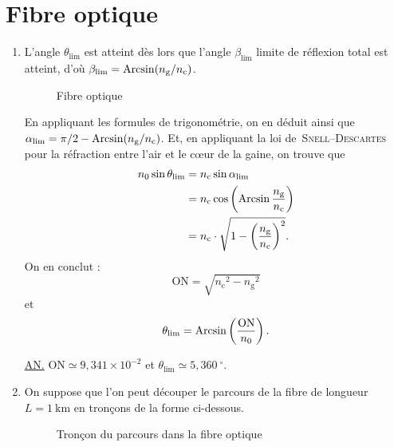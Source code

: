 \section{Fibre optique}

\begin{enumerate}
	\item L'angle $\theta_\mathrm{lim}$ est atteint dès lors que l'angle $\beta_\mathrm{lim}$ limite de réflexion total est atteint, d'où $\beta_\mathrm{lim} = \operatorname{Arcsin}(n_\mathrm{g} / n_\mathrm{c})$.

		\begin{figure}[H]
			\centering
			
			\caption{Fibre optique}
		\end{figure}

		En appliquant les formules de trigonométrie, on en déduit ainsi que $\alpha_\mathrm{lim} = \pi / 2 - \operatorname{Arcsin}(n_\mathrm{g} / n_\mathrm{c})$.
		Et, en appliquant la loi de~\textsc{Snell--Descartes} pour la réfraction entre l'air et le cœur de la gaine, on trouve que
		\begin{align*}
			n_0 \sin \theta_\mathrm{lim}
			&= n_\mathrm{c} \sin \alpha_\mathrm{lim}\\
			&= n_\mathrm{c} \cos\left( \operatorname{Arcsin} \frac{n_\mathrm{g}}{n_\mathrm{c}} \right) \\
			&= n_\mathrm{c} \cdot \sqrt{1 - \left( \frac{n_\mathrm{g}}{n_\mathrm{c}} \right)^2}. \\
		\end{align*}
		On en conclut : \[
			\mathrm{ON} = \sqrt{n_\mathrm{c}{}^2 - n_\mathrm{g}{}^2}
		\] et \[
			\theta_\mathrm{lim} = \operatorname{Arcsin}\left(\frac{\mathrm{ON}}{n_0}\right)
		.\]

		\underline{AN.} $\mathrm{ON} \simeq 9{,}341 \times 10^{-2}$\/ et $\theta_\mathrm{lim} \simeq 5{,}360\:^\circ$.
	\item On suppose que l'on peut découper le parcours de la fibre de longueur $L = 1\:\mathrm{km}$ en tronçons de la forme ci-dessous.

		\begin{figure}[H]
			\centering
			
			\caption{Tronçon du parcours dans la fibre optique}
		\end{figure}


\end{enumerate}
